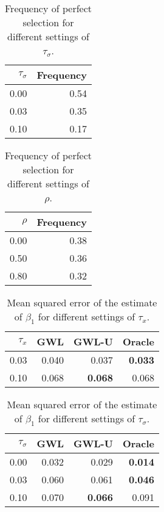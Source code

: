 \documentclass[authoryear, review, 11pt]{elsarticle}
\begin{document}
\begin{table}[ht]
\begin{center}
\begin{tabular}{rr}
 $\tau_{\sigma}$ & Frequency \\ 
  \hline
0.00 & 0.54 \\ 
  0.03 & 0.35 \\ 
  0.10 & 0.17 \\ 
  \end{tabular}
\caption{Frequency of perfect selection for different settings of $\tau_{\sigma}$.}
\end{center}
\end{table}

\begin{table}[ht]
\begin{center}
\begin{tabular}{rr}
 $\rho$ & Frequency \\ 
  \hline
0.00 & 0.38 \\ 
  0.50 & 0.36 \\ 
  0.80 & 0.32 \\ 
  \end{tabular}
\caption{Frequency of perfect selection for different settings of $\rho$.}
\end{center}
\end{table}


\begin{table}[ht]
\begin{center}
\begin{tabular}{rrrr}
$\tau_x$ & GWL & GWL-U & Oracle \\ 
  \hline
0.03 & 0.040 & 0.037 & \textbf{0.033} \\ 
  0.10 & 0.068 & \textbf{0.068} & 0.068 \\ 
  \end{tabular}
\caption{Mean squared error of the estimate of $\beta_1$ for different settings of $\tau_x$.}
\end{center}
\end{table}

\begin{table}[ht]
\begin{center}
\begin{tabular}{rrrr}
 $\tau_\sigma$ & GWL & GWL-U & Oracle \\ 
  \hline
0.00 & 0.032 & 0.029 & \textbf{0.014} \\ 
  0.03 & 0.060 & 0.061 & \textbf{0.046} \\ 
  0.10 & 0.070 & \textbf{0.066} & 0.091 \\ 
  \end{tabular}
\caption{Mean squared error of the estimate of $\beta_1$ for different settings of $\tau_\sigma$.}
\end{center}
\end{table}
\end{document}
